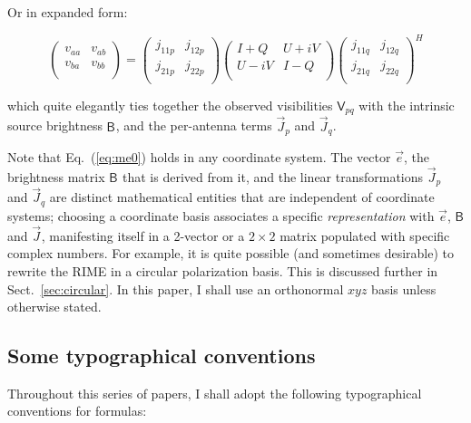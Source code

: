 \documentclass{aa}
\newcommand{\herm}{H}
\newcommand{\jones}[2]{\vec {#1}_{#2}}
\newcommand{\coh}[2]{\mathsf{{#1}}_{{#2}}}
\begin{document}
Or in expanded form:

\[
    \left( 
    \begin{array}{cc}
    v_{aa} & v_{ab} \\
    v_{ba} & v_{bb} \\
    \end{array}
    \right) = 
    \left( 
    \begin{array}{cc}
    j_{11p} & j_{12p} \\
    j_{21p} & j_{22p} \\
    \end{array}
    \right) 
    \left( 
    \begin{array}{cc}
    I+Q & U+iV \\
    U-iV & I-Q \\
    \end{array}
    \right) 
    \left( 
    \begin{array}{cc}
    j_{11q} & j_{12q} \\
    j_{21q} & j_{22q} \\
    \end{array}
    \right)^\herm
\]

which quite elegantly ties together the observed visibilities $\coh{V}{pq}$ with the intrinsic source brightness $\coh{B}{}$, and the per-antenna terms $\jones{J}{p}$ and $\jones{J}{q}$.

Note that Eq.~(\ref{eq:me0}) holds in any coordinate system. The vector $\vec e$, the brightness matrix $\coh{B}{}$ that is derived from it, and the linear transformations $\jones{J}{p}$ and $\jones{J}{q}$ are distinct mathematical entities that are independent of coordinate systems; choosing a coordinate basis associates a specific {\em representation} with $\vec e$,  $\coh{B}{}$ and $\jones{J}{}$, manifesting itself in a 2-vector or a $2\times2$ matrix populated with specific complex numbers. For example, it is quite possible (and sometimes desirable) to rewrite the RIME in a circular polarization basis. This is discussed further in Sect.~\ref{sec:circular}. In this paper, I shall use an orthonormal $xyz$ basis unless otherwise stated.

\subsection{Some typographical conventions}

Throughout this series of papers, I shall adopt the following typographical conventions for formulas:
\end{document}
